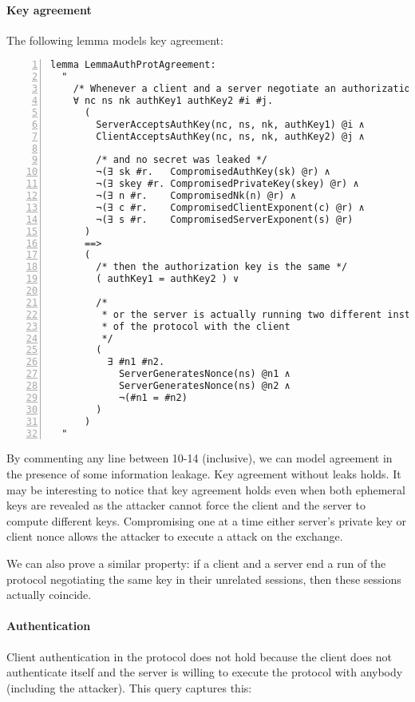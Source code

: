 \paragraph{Key agreement}
The following lemma models key agreement:
\begin{lstlisting}[numbers=left]
lemma LemmaAuthProtAgreement:
  "
    /* Whenever a client and a server negotiate an authorization key */
    ∀ nc ns nk authKey1 authKey2 #i #j.
      (
        ServerAcceptsAuthKey(nc, ns, nk, authKey1) @i ∧
        ClientAcceptsAuthKey(nc, ns, nk, authKey2) @j ∧

        /* and no secret was leaked */
        ¬(∃ sk #r.   CompromisedAuthKey(sk) @r) ∧
        ¬(∃ skey #r. CompromisedPrivateKey(skey) @r) ∧
        ¬(∃ n #r.    CompromisedNk(n) @r) ∧
        ¬(∃ c #r.    CompromisedClientExponent(c) @r) ∧
        ¬(∃ s #r.    CompromisedServerExponent(s) @r)
      )
      ==>
      (
        /* then the authorization key is the same */
        ( authKey1 = authKey2 ) ∨
        
        /* 
         * or the server is actually running two different instances
         * of the protocol with the client
         */
        (
          ∃ #n1 #n2.
            ServerGeneratesNonce(ns) @n1 ∧
            ServerGeneratesNonce(ns) @n2 ∧
            ¬(#n1 = #n2)
        )
      )
  "
\end{lstlisting}

By commenting any line between 10-14 (inclusive), we can model agreement in the presence of some information leakage.
Key agreement without leaks holds. It may be interesting to notice that key agreement holds even when both ephemeral keys are revealed as the attacker cannot force the client and the server to compute different keys. Compromising one at a time either server's private key or client nonce allows the attacker to execute a \mitm{} attack on the \DiHe{} exchange.

We can also prove a similar property: if a client and a server end a run of the protocol negotiating the same key in their unrelated sessions, then these sessions actually coincide.

\paragraph{Authentication}
Client authentication in the protocol does not hold because the client does not authenticate itself and the server is willing to execute the protocol with anybody (including the attacker). This query captures this:

